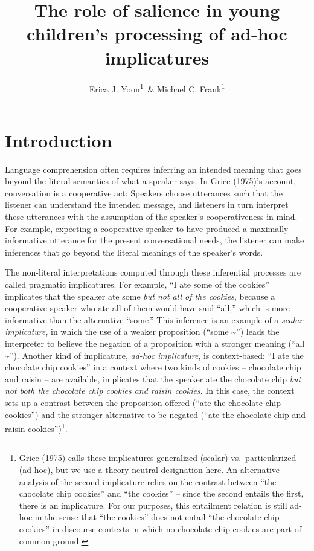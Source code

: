 \documentclass[mask,man]{apa6}
\title{The role of salience in young children's processing of ad-hoc
implicatures}
\author{Erica J. Yoon\textsuperscript{1}~\& Michael C. Frank\textsuperscript{1}}
\affiliation{
    \vspace{0.5cm}
          \textsuperscript{1} Stanford University  }
\theoremstyle{definition}
\theoremstyle{definition}
\theoremstyle{definition}
\theoremstyle{remark}
\begin{document}
\maketitle

\setcounter{secnumdepth}{0}



\section{Introduction}\label{introduction}

Language comprehension often requires inferring an intended meaning that
goes beyond the literal semantics of what a speaker says. In Grice
(1975)'s account, conversation is a cooperative act: Speakers choose
utterances such that the listener can understand the intended message,
and listeners in turn interpret these utterances with the assumption of
the speaker's cooperativeness in mind. For example, expecting a
cooperative speaker to have produced a maximally informative utterance
for the present conversational needs, the listener can make inferences
that go beyond the literal meanings of the speaker's words.

The non-literal interpretations computed through these inferential
processes are called pragmatic implicatures. For example, \enquote{I ate
some of the cookies} implicates that the speaker ate some \emph{but not
all of the cookies}, because a cooperative speaker who ate all of them
would have said \enquote{all,} which is more informative than the
alternative \enquote{some.} This inference is an example of a
\emph{scalar implicature}, in which the use of a weaker proposition
(\enquote{some \textasciitilde{}}) leads the interpreter to believe the
negation of a proposition with a stronger meaning (\enquote{all
\textasciitilde{}}). Another kind of implicature, \emph{ad-hoc
implicature}, is context-based: \enquote{I ate the chocolate chip
cookies} in a context where two kinds of cookies -- chocolate chip and
raisin -- are available, implicates that the speaker ate the chocolate
chip \emph{but not both the chocolate chip cookies and raisin cookies}.
In this case, the context sets up a contrast between the proposition
offered (\enquote{ate the chocolate chip cookies}) and the stronger
alternative to be negated (\enquote{ate the chocolate chip and raisin
cookies})\footnote{Grice (1975) calls these implicatures generalized
  (scalar) vs.~particularized (ad-hoc), but we use a theory-neutral
  designation here. An alternative analysis of the second implicature
  relies on the contrast between \enquote{the chocolate chip cookies}
  and \enquote{the cookies} -- since the second entails the first, there
  is an implicature. For our purposes, this entailment relation is still
  ad-hoc in the sense that \enquote{the cookies} does not entail
  \enquote{the chocolate chip cookies} in discourse contexts in which no
  chocolate chip cookies are part of common ground.}.
\end{document}
